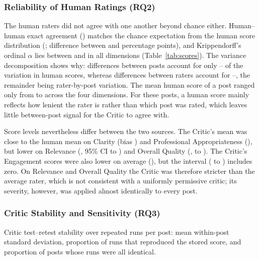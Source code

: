 \documentclass[a4paper,twoside]{article}
\begin{document}
\subsubsection{Reliability of Human Ratings (RQ2)}

The human raters did not agree with one another beyond chance either. Human--human exact agreement (\HHexAll{}) matches the chance expectation from the human score distribution (\HHchanceExAll{}; difference between \HHChanceDiffExLo{} and \HHChanceDiffExHi{} percentage points), and Krippendorff's ordinal $\alpha$ lies between \AlphaMin{} and \AlphaMax{} in all dimensions (Table~\ref{tab:scores}). The variance decomposition shows why: differences between posts account for only \VarPostMin{}--\VarPostMax{} of the variation in human scores, whereas differences between raters account for \VarRaterMin{}--\VarRaterMax{}, the remainder being rater-by-post variation. The mean human score of a post ranged only from \PostMeanMin{} to \PostMeanMax{} across the four dimensions. For these posts, a human score mainly reflects how lenient the rater is rather than which post was rated, which leaves little between-post signal for the Critic to agree with.

Score levels nevertheless differ between the two sources. The Critic's mean was close to the human mean on Clarity (bias \BiasCla{}) and Professional Appropriateness (\BiasPro{}), but lower on Relevance (\BiasRel{}, 95\% CI \BiasLoRel{} to \BiasHiRel{}) and Overall Quality (\BiasOve{}, \BiasLoOve{} to \BiasHiOve{}). The Critic's Engagement scores were also lower on average (\BiasEng{}), but the interval (\BiasLoEng{} to \BiasHiEng{}) includes zero. On Relevance and Overall Quality the Critic was therefore stricter than the average rater, which is not consistent with a uniformly permissive critic; its severity, however, was applied almost identically to every post.

\subsubsection{Critic Stability and Sensitivity (RQ3)}

\begin{table}[t]
\centering
\caption{Critic test--retest stability over \RepRuns{} repeated runs per post: mean within-post standard deviation, proportion of runs that reproduced the stored score, and proportion of posts whose runs were all identical.}
\label{tab:repeat}
\begin{adjustbox}{max width=\columnwidth}

\end{adjustbox}
\end{table}
\end{document}

